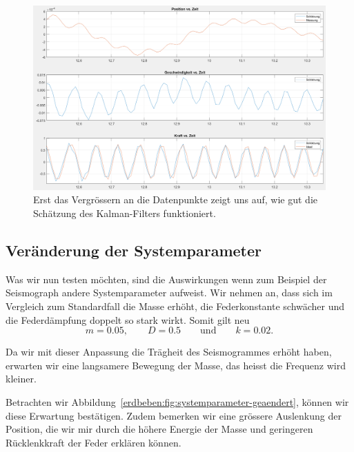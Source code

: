 \begin{figure}
	\begin{center}
		\includegraphics[width=\linewidth,keepaspectratio]{papers/erdbeben/Standard_Zoom.PNG}
		\caption{Erst das Vergrössern an die Datenpunkte zeigt uns auf, wie gut die Schätzung des Kalman-Filters funktioniert.}
    \label{erdbeben:fig:standard-zoom}
	\end{center}
\end{figure}

\subsection{Veränderung der Systemparameter}
Was wir nun testen möchten, sind die Auswirkungen wenn zum Beispiel der Seismograph andere Systemparameter aufweist.
Wir nehmen an, dass sich im Vergleich zum Standardfall die Masse erhöht, die Federkonstante schwächer und die Federdämpfung doppelt so stark wirkt.
Somit gilt neu
\[
m = 0.05,
\qquad
D = 0.5
\qquad \text{und} \qquad
k = 0.02.
\]

Da wir mit dieser Anpassung die Trägheit des Seismogrammes erhöht haben,
erwarten wir eine langsamere Bewegung der Masse,
das heisst die Frequenz wird kleiner.

Betrachten wir Abbildung~\ref{erdbeben:fig:systemparameter-geaendert},
können wir diese Erwartung bestätigen.
Zudem bemerken wir eine grössere Auslenkung der Position,
die wir mir durch die höhere Energie der Masse und geringeren Rücklenkkraft der Feder erklären können.

